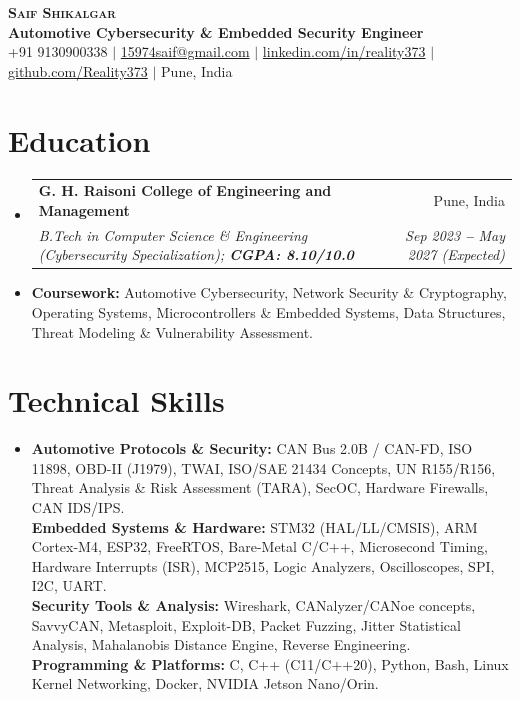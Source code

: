 \documentclass[letterpaper,9pt]{extarticle}
\makeatletter
\newcommand{\resumeSubheading}[4]{
  \vspace{-2pt}\item
    \begin{tabular*}{\linewidth}[t]{l@{\extracolsep{\fill}}r}
      \textbf{#1} & #2 \\
      \textit{\small#3} & \textit{\small #4} \\
    \end{tabular*}\vspace{-5pt}
}
\newcommand{\resumeSubHeadingListStart}{\begin{itemize}[leftmargin=0.08in, label={}]}
\newcommand{\resumeSubHeadingListEnd}{\end{itemize}\vspace{-5pt}}
\makeatother
\begin{document}
\begin{center}
    \textbf{\LARGE \scshape Saif Shikalgar} \\ \vspace{2pt}
    \small
    \textbf{Automotive Cybersecurity \& Embedded Security Engineer} \\ \vspace{1.5pt}
    +91 9130900338
    $|$
    \href{mailto:15974saif@gmail.com}{15974saif@gmail.com}
    $|$
    \href{https://www.linkedin.com/in/reality373}{linkedin.com/in/reality373}
    $|$
    \href{https://github.com/Reality373}{github.com/Reality373}
    $|$
    Pune, India
\end{center}
\vspace{-6pt}

\section{Education}
  \vspace{1pt}
  \resumeSubHeadingListStart
    \resumeSubheading
      {G. H. Raisoni College of Engineering and Management}{Pune, India}
      {B.Tech in Computer Science \& Engineering (Cybersecurity Specialization); \textbf{CGPA: 8.10/10.0}}{Sep 2023 \textbf{--} May 2027 (Expected)}
      \vspace{-2pt}
      \item{
        \small{\textbf{Coursework:} Automotive Cybersecurity, Network Security \& Cryptography, Operating Systems, Microcontrollers \& Embedded Systems, Data Structures, Threat Modeling \& Vulnerability Assessment.}
      }
  \resumeSubHeadingListEnd

\section{Technical Skills}
  \vspace{1pt}
  \resumeSubHeadingListStart
    \item{
        \small{\textbf{Automotive Protocols \& Security:}{ CAN Bus 2.0B / CAN-FD, ISO 11898, OBD-II (J1979), TWAI, ISO/SAE 21434 Concepts, UN R155/R156, Threat Analysis \& Risk Assessment (TARA), SecOC, Hardware Firewalls, CAN IDS/IPS.}} \\ \vspace{1.5pt}
        \small{\textbf{Embedded Systems \& Hardware:}{ STM32 (HAL/LL/CMSIS), ARM Cortex-M4, ESP32, FreeRTOS, Bare-Metal C/C++, Microsecond Timing, Hardware Interrupts (ISR), MCP2515, Logic Analyzers, Oscilloscopes, SPI, I2C, UART.}} \\ \vspace{1.5pt}
        \small{\textbf{Security Tools \& Analysis:}{ Wireshark, CANalyzer/CANoe concepts, SavvyCAN, Metasploit, Exploit-DB, Packet Fuzzing, Jitter Statistical Analysis, Mahalanobis Distance Engine, Reverse Engineering.}} \\ \vspace{1.5pt}
        \small{\textbf{Programming \& Platforms:}{ C, C++ (C11/C++20), Python, Bash, Linux Kernel Networking, Docker, NVIDIA Jetson Nano/Orin.}}
    }
  \resumeSubHeadingListEnd
\end{document}
